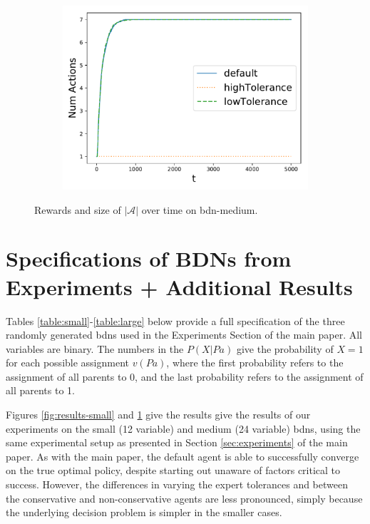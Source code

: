\documentclass{article}
\newcommand{\bdn}{{\sc bdn}}
\newcommand{\Pa}{\mathit{Pa}}
\begin{document}
\begin{figure}
\begin{subfigure}{0.333\textwidth}
				\includegraphics[width=\textwidth]{mediumDNActions}
				\caption{}
			\end{subfigure}		
			\caption{Rewards and size of $|\mathcal{A}|$ over time on bdn-medium.}
			\label{fig:results-medium}
		\end{figure}
					
		\section{Specifications of BDNs from Experiments + Additional Results}
		
		Tables \ref{table:small}-\ref{table:large} below provide a full specification of the three randomly generated \bdn{}s used in the Experiments Section of the main paper. All variables are binary. The numbers in the $P(X|\Pa)$ give the probability of $X=1$ for each possible assignment $v(\Pa)$, where the first probability refers to the assignment of all parents to 0, and the last probability refers to the assignment of all parents to 1.
		
		Figures \ref{fig:results-small} and \ref{fig:results-medium} give the results give the results of our experiments on the small (12 variable) and medium (24 variable) \bdn{}s, using the same experimental setup as presented in Section \ref{sec:experiments} of the main paper. As with the main paper, the default agent is able to successfully converge on the true optimal policy, despite starting out unaware of factors critical to success. However, the differences in varying the expert tolerances and between the conservative and non-conservative agents are less pronounced, simply because the underlying decision problem is simpler in the smaller cases.
		
\end{document}
